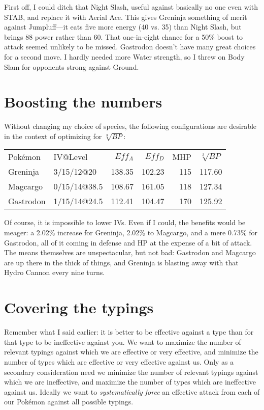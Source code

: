 First off, I could ditch that Night Slash, useful against basically no one even with STAB,
  and replace it with Aerial Ace.
This gives Greninja something of merit against Jumpluff---it eats five more energy
  (40 vs. 35) than Night Slash, but brings 88 power rather than 60.
That one-in-eight chance for a 50\% boost to attack seemed unlikely to be missed.
Gastrodon doesn't have many great choices for a second move.
I hardly needed more Water strength, so I threw on Body Slam for opponents strong
  against Ground.

\section{Boosting the numbers}
Without changing my choice of species, the following configurations are desirable
  in the context of optimizing for $\sqrt[3]{BP}$:
\begin{center}
  \begin{tabular}{llrrrr}
    Pokémon & IV@Level & $Eff_A$ & $Eff_D$ & MHP & $\sqrt[3]{BP}$\\
    \Midrule
    Greninja & 3/15/12@20 & 138.35 & 102.23 & 115 & 117.60\\
    Magcargo & 0/15/14@38.5 & 108.67 & 161.05 & 118 & 127.34\\
    Gastrodon & 1/15/14@24.5 & 112.41 & 104.47 & 170 & 125.92\\
  \end{tabular}
\end{center}
Of course, it is impossible to lower IVs.
Even if I could, the benefits would be meager: a 2.02\% increase for Greninja,
  2.02\% to Magcargo, and a mere 0.73\% for Gastrodon, all of it coming
  in defense and HP at the expense of a bit of attack.
The means themselves are unspectacular, but not bad: Gastrodon and Magcargo are up there
  in the thick of things, and Greninja is blasting away with that Hydro Cannon every nine turns.

\section{Covering the typings}
Remember what I said earlier: it is better to be effective against a type than for that
  type to be ineffective against you.
We want to maximize the number of relevant typings against which we are effective or
  very effective, and minimize the number of types which are effective or very effective against us.
Only as a secondary consideration need we minimize the number of relevant
  typings against which we are ineffective, and maximize the number of types
  which are ineffective against us.
Ideally we want to \textit{systematically force} an effective attack from each
  of our Pokémon against all possible typings.

